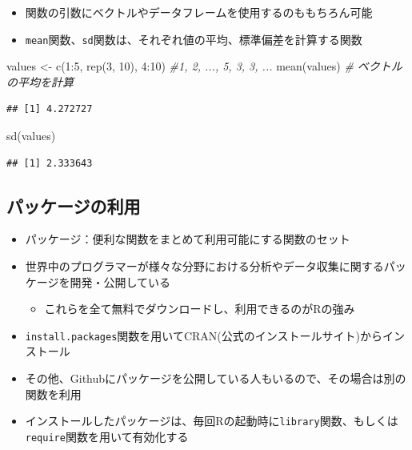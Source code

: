 \documentclass[
]{ltjsarticle}
\newenvironment{Shaded}{\begin{snugshade}}{\end{snugshade}}
\newcommand{\CommentTok}[1]{\textcolor[rgb]{0.56,0.35,0.01}{\textit{#1}}}
\newcommand{\DecValTok}[1]{\textcolor[rgb]{0.00,0.00,0.81}{#1}}
\newcommand{\FunctionTok}[1]{\textcolor[rgb]{0.00,0.00,0.00}{#1}}
\newcommand{\NormalTok}[1]{#1}
\newcommand{\OtherTok}[1]{\textcolor[rgb]{0.56,0.35,0.01}{#1}}
\newcommand{\SpecialCharTok}[1]{\textcolor[rgb]{0.00,0.00,0.00}{#1}}
\providecommand{\tightlist}{%
  \setlength{\itemsep}{0pt}\setlength{\parskip}{0pt}}
\begin{document}
\begin{itemize}
\tightlist
\item
  関数の引数にベクトルやデータフレームを使用するのももちろん可能
\item
  \texttt{mean}関数、\texttt{sd}関数は、それぞれ値の平均、標準偏差を計算する関数
\end{itemize}

\begin{Shaded}
\begin{Highlighting}[]
\NormalTok{values }\OtherTok{\textless{}{-}} \FunctionTok{c}\NormalTok{(}\DecValTok{1}\SpecialCharTok{:}\DecValTok{5}\NormalTok{, }\FunctionTok{rep}\NormalTok{(}\DecValTok{3}\NormalTok{, }\DecValTok{10}\NormalTok{), }\DecValTok{4}\SpecialCharTok{:}\DecValTok{10}\NormalTok{) }\CommentTok{\#1, 2, ..., 5, 3, 3, ... }
\FunctionTok{mean}\NormalTok{(values) }\CommentTok{\# ベクトルの平均を計算}
\end{Highlighting}
\end{Shaded}

\begin{verbatim}
## [1] 4.272727
\end{verbatim}

\begin{Shaded}
\begin{Highlighting}[]
\FunctionTok{sd}\NormalTok{(values)}
\end{Highlighting}
\end{Shaded}

\begin{verbatim}
## [1] 2.333643
\end{verbatim}

\hypertarget{ux30d1ux30c3ux30b1ux30fcux30b8ux306eux5229ux7528}{%
\subsection{パッケージの利用}\label{ux30d1ux30c3ux30b1ux30fcux30b8ux306eux5229ux7528}}

\begin{itemize}
\tightlist
\item
  パッケージ：便利な関数をまとめて利用可能にする関数のセット
\item
  世界中のプログラマーが様々な分野における分析やデータ収集に関するパッケージを開発・公開している

  \begin{itemize}
  \tightlist
  \item
    これらを全て無料でダウンロードし、利用できるのがRの強み
  \end{itemize}
\item
  \texttt{install.packages}関数を用いてCRAN(公式のインストールサイト)からインストール
\item
  その他、Githubにパッケージを公開している人もいるので、その場合は別の関数を利用
\item
  インストールしたパッケージは、毎回Rの起動時に\texttt{library}関数、もしくは\texttt{require}関数を用いて有効化する
\end{itemize}
\end{document}
